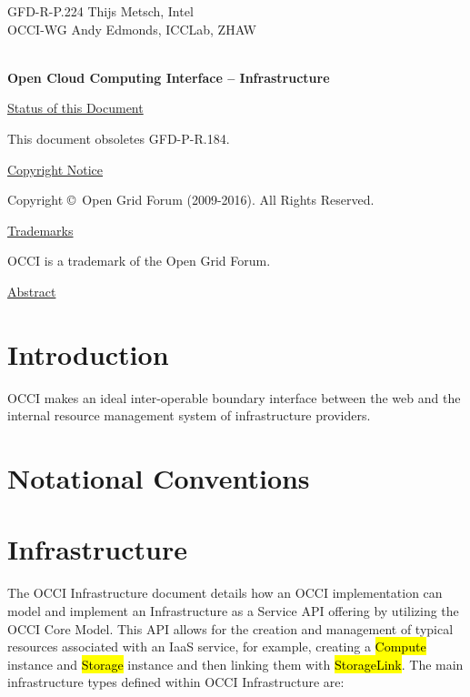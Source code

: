 \documentclass[10pt,a4paper]{article}
\begin{document}
\thispagestyle{empty}

GFD-R-P.224 \hfill  Thijs Metsch, Intel\\
OCCI-WG \hfill  Andy Edmonds, ICCLab, ZHAW\\
\\

\vspace*{0.5in}

\begin{Large}
\textbf{Open Cloud Computing Interface -- Infrastructure}
\end{Large}

\vspace*{0.5in}

\underline{Status of this Document}



This document obsoletes GFD-P-R.184.

\underline{Copyright Notice}

Copyright \copyright ~Open Grid Forum (2009-2016). All Rights
Reserved.

\underline{Trademarks}

OCCI is a trademark of the Open Grid Forum.

\underline{Abstract}



\newpage
\tableofcontents
\newpage

\section{Introduction}


OCCI makes an ideal inter-operable boundary interface between the web
and the internal resource management system of infrastructure
providers.

\section{Notational Conventions}



\section{Infrastructure}
The OCCI Infrastructure document details how an OCCI implementation
can model and implement an Infrastructure as a Service API offering by
utilizing the OCCI Core Model. This API allows for the creation and
management of typical resources associated with an IaaS service, for
example, creating a \hl{Compute} instance and \hl{Storage} instance
and then linking them with \hl{StorageLink}. The main infrastructure
types defined within OCCI Infrastructure are:
\end{document}
